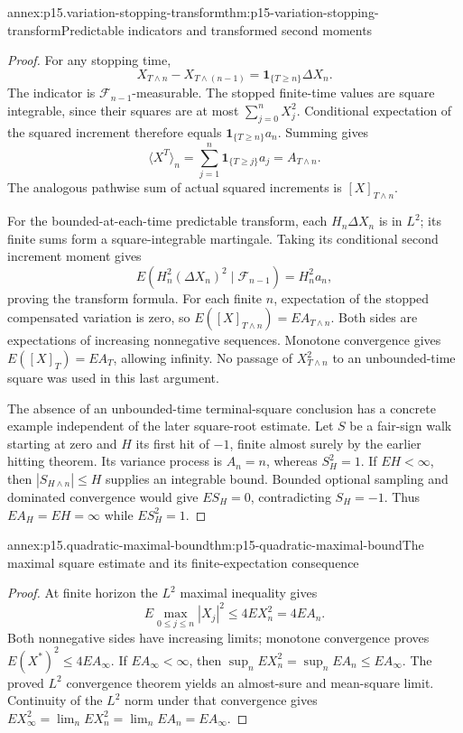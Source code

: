 \begin{annexitem}{annex:p15.variation-stopping-transform}{thm:p15-variation-stopping-transform}{Predictable indicators and transformed second moments}
\begin{proof}
For any stopping time,
\[
             X_{T\wedge n}-X_{T\wedge(n-1)}
                               =\mathbf1_{\{T\geq n\}}\Delta X_n.
\]
The indicator is \(\mathcal F_{n-1}\)-measurable.
The stopped finite-time values are square integrable, since their
squares are at most \(\sum_{j=0}^nX_j^2\).
Conditional expectation of the squared increment therefore equals
\(\mathbf1_{\{T\geq n\}}a_n\).
Summing gives
\[
                  \langle X^T\rangle_n
                    =\sum_{j=1}^n\mathbf1_{\{T\geq j\}}a_j=A_{T\wedge n}.
\]
The analogous pathwise sum of actual squared increments is
\([X]_{T\wedge n}\).

For the bounded-at-each-time predictable transform,
each \(H_n\Delta X_n\) is in \(L^2\); its finite sums form a
square-integrable martingale. Taking its conditional second
increment moment gives
\[
 E(H_n^2(\Delta X_n)^2\mid\mathcal F_{n-1})=H_n^2a_n,
\]
proving the transform formula.
For each finite \(n\), expectation of the stopped compensated
variation is zero, so
\(E([X]_{T\wedge n})=EA_{T\wedge n}\).
Both sides are expectations of increasing nonnegative sequences.
Monotone convergence gives \(E([X]_T)=EA_T\), allowing infinity.
No passage of \(X_{T\wedge n}^2\) to an unbounded-time square
was used in this last argument.

The absence of an unbounded-time terminal-square conclusion has
a concrete example independent of the later square-root estimate.
Let \(S\) be a fair-sign walk starting at zero and \(H\) its first
hit of \(-1\), finite almost surely by the earlier hitting theorem.
Its variance process is \(A_n=n\), whereas \(S_H^2=1\).
If \(EH<\infty\), then \(|S_{H\wedge n}|\leq H\) supplies an
integrable bound. Bounded optional sampling and dominated convergence
would give \(ES_H=0\), contradicting \(S_H=-1\).
Thus \(EA_H=EH=\infty\) while \(ES_H^2=1\).
\end{proof}
\end{annexitem}

\begin{annexitem}{annex:p15.quadratic-maximal-bound}{thm:p15-quadratic-maximal-bound}{The maximal square estimate and its finite-expectation consequence}
\begin{proof}
At finite horizon the \(L^2\) maximal inequality gives
\[
                    E\max_{0\leq j\leq n}|X_j|^2
                                 \leq4EX_n^2=4EA_n.
\]
Both nonnegative sides have increasing limits; monotone
convergence proves \(E(X^*)^2\leq4EA_\infty\).
If \(EA_\infty<\infty\), then
\(\sup_nEX_n^2=\sup_nEA_n\leq EA_\infty\).
The proved \(L^2\) convergence theorem yields an almost-sure
and mean-square limit.
Continuity of the \(L^2\) norm under that convergence gives
\(EX_\infty^2=\lim_nEX_n^2=\lim_nEA_n=EA_\infty\).
\end{proof}
\end{annexitem}

